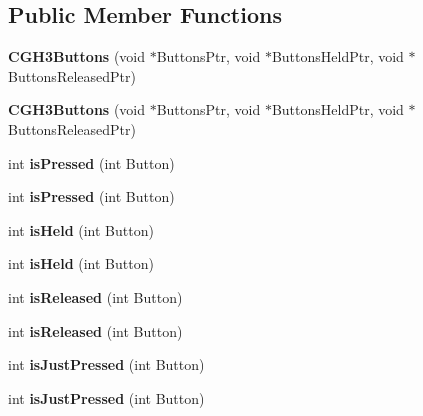 \subsection*{Public Member Functions}
\begin{DoxyCompactItemize}
\item 
\hypertarget{class_c_g_h3_buttons_ac55bb0fb3a0f63e9ec9df0e013fac45c}{{\bfseries C\-G\-H3\-Buttons} (void $\ast$Buttons\-Ptr, void $\ast$Buttons\-Held\-Ptr, void $\ast$Buttons\-Released\-Ptr)}\label{class_c_g_h3_buttons_ac55bb0fb3a0f63e9ec9df0e013fac45c}

\item 
\hypertarget{class_c_g_h3_buttons_ac55bb0fb3a0f63e9ec9df0e013fac45c}{{\bfseries C\-G\-H3\-Buttons} (void $\ast$Buttons\-Ptr, void $\ast$Buttons\-Held\-Ptr, void $\ast$Buttons\-Released\-Ptr)}\label{class_c_g_h3_buttons_ac55bb0fb3a0f63e9ec9df0e013fac45c}

\item 
\hypertarget{class_c_button_base_a0d4758b9e756a8c3c2bb39b907ea9170}{int {\bfseries is\-Pressed} (int Button)}\label{class_c_button_base_a0d4758b9e756a8c3c2bb39b907ea9170}

\item 
\hypertarget{class_c_button_base_a0d4758b9e756a8c3c2bb39b907ea9170}{int {\bfseries is\-Pressed} (int Button)}\label{class_c_button_base_a0d4758b9e756a8c3c2bb39b907ea9170}

\item 
\hypertarget{class_c_button_base_a67e38daead9d22e33f6a3d85902d1f98}{int {\bfseries is\-Held} (int Button)}\label{class_c_button_base_a67e38daead9d22e33f6a3d85902d1f98}

\item 
\hypertarget{class_c_button_base_a67e38daead9d22e33f6a3d85902d1f98}{int {\bfseries is\-Held} (int Button)}\label{class_c_button_base_a67e38daead9d22e33f6a3d85902d1f98}

\item 
\hypertarget{class_c_button_base_a575dee487bcca1abf29c1084dfdd5bb8}{int {\bfseries is\-Released} (int Button)}\label{class_c_button_base_a575dee487bcca1abf29c1084dfdd5bb8}

\item 
\hypertarget{class_c_button_base_a575dee487bcca1abf29c1084dfdd5bb8}{int {\bfseries is\-Released} (int Button)}\label{class_c_button_base_a575dee487bcca1abf29c1084dfdd5bb8}

\item 
\hypertarget{class_c_button_base_ab74fd21217c5e379a613b7474af4f9b8}{int {\bfseries is\-Just\-Pressed} (int Button)}\label{class_c_button_base_ab74fd21217c5e379a613b7474af4f9b8}

\item 
\hypertarget{class_c_button_base_ab74fd21217c5e379a613b7474af4f9b8}{int {\bfseries is\-Just\-Pressed} (int Button)}\label{class_c_button_base_ab74fd21217c5e379a613b7474af4f9b8}

\end{DoxyCompactItemize}



